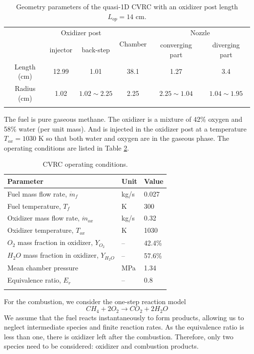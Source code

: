 \begin{table} [h]
	\centering
	\caption{Geometry parameters of the quasi-1D CVRC with an oxidizer post length $L_{op}=14$ cm.}
	\centering
	\begin{tabular}{c c c c c c }
		\toprule
		\centering
		\multirow{2}{*}{Section} &
		\multicolumn{2}{c}{Oxidizer post} &
		\multirow{2}{*}{Chamber} &
		\multicolumn{2}{c}{Nozzle} \\
		\cmidrule(lr){2-3} \cmidrule(lr){5-6}
		& injector & back-step & & converging part & diverging part\\
		\midrule
		Length (cm) & 12.99 & 1.01 & 38.1 & 1.27 & 3.4 \\
		Radius (cm) & 1.02  & $1.02 \sim 2.25$ & 2.25 & $2.25 \sim 1.04$ & $1.04 \sim 1.95$ \\
		\bottomrule
		\label{tab:geometry_parameters}
	\end{tabular} 
\end{table}
The fuel is pure gaseous methane. The oxidizer is a mixture of 42\% oxygen and 58\% water (per unit mass). And is injected in the oxidizer post at a temperature $T_{ox}=1030$ K so that both water and oxygen are in the gaseous phase. The operating conditions are listed in Table \ref{tab:operating-conditions}.

\begin{table} [h]
	\centering
	\caption{CVRC operating conditions.}
	\centering
	\begin{tabular}{l l l}
		\toprule
		\centering
		Parameter & Unit & Value \\
		\midrule
		Fuel mass flow rate, $\dot{m}_{f}$ & kg/s & 0.027   \\
		Fuel temperature, $T_{f}$ & K & 300   \\
		Oxidizer mass flow rate, $\dot{m}_{ox}$ & kg/s & 0.32   \\
		Oxidizer temperature, $T_{ox}$ & K & 1030   \\
		$O_2$ mass fraction in oxidizer, $Y_{O_2}$ & -- & 42.4\%   \\
		$H_2O$ mass fraction in oxidizer, $Y_{H_2O}$ & -- & 57.6\%   \\
		Mean chamber pressure & MPa & 1.34 \\
		Equivalence ratio, $E_r$ & -- & 0.8 \\
		\bottomrule
		\label{tab:operating-conditions}
	\end{tabular} 
\end{table}

For the combustion, we consider the one-step reaction model
\begin{equation*}\label{eq:combustion}
CH_4 + 2O_2 \rightarrow CO_2 + 2H_2O
\end{equation*}
We assume that the fuel reacts instantaneously to form products, allowing us to neglect intermediate species and finite reaction rates. As the equivalence ratio is less than one, there is oxidizer left after the combustion. Therefore, only two species need to be considered: oxidizer and combustion products.


